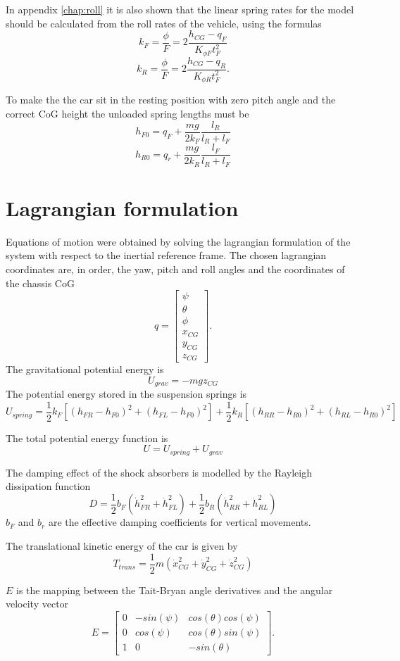 In appendix \ref{chap:roll} it is also shown that the linear spring rates for the model should be calculated from the roll rates of the vehicle, using the formulas
$$
k_F = \frac{\phi}{F} = 2\frac{h_{CG}-q_F}{K_{\phi F} t_F^2}
$$
$$
k_R = \frac{\phi}{F} = 2\frac{h_{CG}-q_R}{K_{\phi R} t_F^2}.
$$


To make the the car sit in the resting position with zero pitch angle and the correct CoG height the unloaded spring lengths must be
$$ h_{F0} = q_F + \frac{mg}{2k_F}\frac{l_R}{l_R+l_F} $$
$$ h_{R0} = q_r + \frac{mg}{2k_R}\frac{l_F}{l_R+l_F} $$

\section{Lagrangian formulation}
\label{sec:6doflag}
Equations of motion were obtained by solving the lagrangian formulation of the system with respect to the inertial reference frame.
The chosen lagrangian coordinates are, in order, the yaw, pitch and roll angles and the coordinates of the chassis CoG
$$
q = \begin{bmatrix}
\psi \\
\theta \\
\phi \\
x_{CG} \\
y_{CG} \\
z_{CG}
\end{bmatrix}.
$$
The gravitational potential energy is
$$U_{grav} = -mgz_{CG}$$
The potential energy stored in the suspension springs is
$$ U_{spring} = \frac{1}{2} k_F [(h_{FR} - h_{F0})^2 + (h_{FL} - h_{F0})^2] +  \frac{1}{2} k_R [(h_{RR} - h_{R0})^2 + (h_{RL} - h_{R0})^2] $$

The total potential energy function is
$$ U = U_{spring} + U_{grav} $$

The damping effect of the shock absorbers is modelled by the Rayleigh dissipation function
$$ D = \frac{1}{2} b_F (\dot h_{FR}^2 + \dot h_{FL}^2) + \frac{1}{2} b_R (\dot h_{RR}^2 + \dot h_{RL}^2) $$
$b_F$ and $b_r$ are the effective damping coefficients for vertical movements.

The translational kinetic energy of the car is given by
$$ T_{trans} = \frac{1}{2} m (\dot x_{CG}^2 +\dot y_{CG}^2 +\dot z_{CG}^2 ) $$

$E$ is the mapping between the Tait-Bryan angle derivatives and the angular velocity vector
$$
E=\begin{bmatrix}
0 & -sin(\psi)      & cos(\theta)cos(\psi)\\
0      & cos(\psi) &  cos(\theta)sin(\psi) \\
1 & 0      & -sin(\theta)
\end{bmatrix}.
$$

